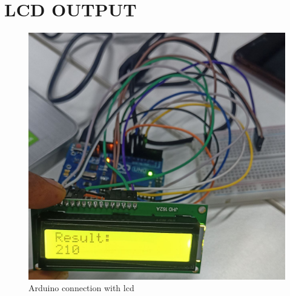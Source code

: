 \documentclass[journal,12pt,twocolumn]{IEEEtran}
\begin{document}
    \section{LCD OUTPUT}

 \begin{figure}[H]
\centering
\includegraphics[width=\columnwidth]{lcd.png}
\caption{Arduino connection with lcd}
\label{fig:lcd}
\end{figure}

 
\end{document}
